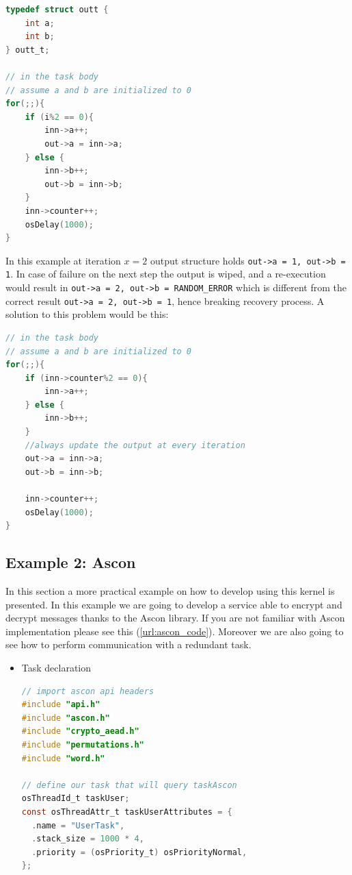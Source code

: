 \documentclass[a4paper, 12pt]{article}
\begin{document}
\begin{onehalfspace}
\begin{enumerate}
{\begin{itemize}
{\begin{enumerate}
{\begin{lstlisting}[language=C]
typedef struct outt {
    int a;
    int b;
} outt_t;

// in the task body
// assume a and b are initialized to 0
for(;;){
    if (i%2 == 0){
        inn->a++;
        out->a = inn->a;
    } else {
        inn->b++;
        out->b = inn->b;
    }
    inn->counter++;
    osDelay(1000);
}

    \end{lstlisting}
    In this example at iteration $x=2$ output structure holds \texttt{out->a = 1, out->b = 1}. In case of failure on the next step the output is wiped, and a re-execution would result in \texttt{out->a = 2, out->b = RANDOM\_ERROR} which is different from the correct result \texttt{out->a = 2, out->b = 1}, hence breaking recovery process. A solution to this problem would be this:
            \begin{lstlisting}[language=C]
// in the task body
// assume a and b are initialized to 0
for(;;){
    if (inn->counter%2 == 0){
        inn->a++;
    } else {
        inn->b++;
    }
    //always update the output at every iteration
    out->a = inn->a;
    out->b = inn->b;
    
    inn->counter++;
    osDelay(1000);
}

    \end{lstlisting}
    }
    \end{enumerate}
    
    }
    \end{itemize}
    }
\end{enumerate}

\subsection{Example 2: Ascon}
In this section a more practical example on how to develop using this kernel is presented. In this example we are going to develop a service able to encrypt and decrypt messages thanks to the Ascon library. If you are not familiar with Ascon implementation please see this (\ref{url:ascon_code}). Moreover we are also going to see how to perform communication with a redundant task.
\begin{itemize}
    \item {
    Task declaration
    \begin{lstlisting}[language=C]
// import ascon api headers
#include "api.h"
#include "ascon.h"
#include "crypto_aead.h"
#include "permutations.h"
#include "word.h"

// define our task that will query taskAscon
osThreadId_t taskUser;
const osThreadAttr_t taskUserAttributes = {
  .name = "UserTask",
  .stack_size = 1000 * 4,
  .priority = (osPriority_t) osPriorityNormal,
};


\end{lstlisting}}
\end{itemize}
\end{onehalfspace}
\end{document}
